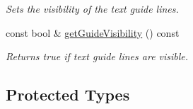 \begin{DoxyCompactItemize}
\begin{DoxyCompactList}\small\item\em Sets the visibility of the text guide lines. \end{DoxyCompactList}\item 
\hypertarget{class_ui_text_ab8d8f4aa9181d4356819ff1eb45af0dc}{const bool \& \hyperlink{class_ui_text_ab8d8f4aa9181d4356819ff1eb45af0dc}{get\-Guide\-Visibility} () const }\label{class_ui_text_ab8d8f4aa9181d4356819ff1eb45af0dc}

\begin{DoxyCompactList}\small\item\em Returns true if text guide lines are visible. \end{DoxyCompactList}\end{DoxyCompactItemize}
\subsection*{Protected Types}
